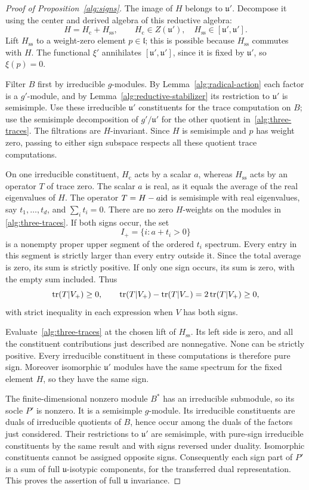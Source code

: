\begin{proof}[Proof of Proposition~\ref{alg:signs}]
The image of $H$ belongs to $\mathfrak u'$. Decompose it using the
center and derived algebra of this reductive algebra:
\[
 H=H_{\mathrm c}+H_{\mathrm{ss}},
 \qquad
 H_{\mathrm c}\in Z(\mathfrak u'),
 \quad H_{\mathrm{ss}}\in[\mathfrak u',\mathfrak u'].
\]
Lift $H_{\mathrm{ss}}$ to a weight-zero element
$p\in\mathfrak l$; this is possible because $H_{\mathrm{ss}}$
commutes with $H$. The functional $\xi'$ annihilates
$[\mathfrak u',\mathfrak u']$, since it is fixed by
$\mathfrak u'$, so $\xi(p)=0$.

Filter $B$ first by irreducible $g$-modules. By
Lemma~\ref{alg:radical-action} each factor is a $g'$-module, and by
Lemma~\ref{alg:reductive-stabilizer} its restriction to
$\mathfrak u'$ is semisimple. Use these irreducible
$\mathfrak u'$ constituents for the trace computation on $B$;
use the semisimple decomposition of $g'/\mathfrak u'$ for the
other quotient in~\eqref{alg:three-traces}. The filtrations are
$H$-invariant. Since $H$ is semisimple and $p$ has weight zero,
passing to either sign subspace respects all these quotient trace
computations.

On one irreducible constituent, $H_{\mathrm c}$ acts by a scalar
$a$, whereas $H_{\mathrm{ss}}$ acts by an operator $T$ of trace
zero. The scalar $a$ is real, as it equals the average of the real
eigenvalues of $H$. The operator $T=H-a\mathrm{id}$ is semisimple with
real eigenvalues, say $t_1,\ldots,t_d$, and
$\sum_i t_i=0$. There are no zero $H$-weights on the modules in
\eqref{alg:three-traces}. If both signs occur, the set
\[
 I_+=\{i:a+t_i>0\}
\]
is a nonempty proper upper segment of the ordered $t_i$ spectrum.
Every entry in this segment is strictly larger than every entry
outside it. Since the total average is zero, its sum is strictly
positive. If only one sign occurs, its sum is zero, with the empty
sum included. Thus
\[
 \operatorname{tr}(T|V_+)\ge0,
 \qquad
 \operatorname{tr}(T|V_+)-\operatorname{tr}(T|V_-)=2\operatorname{tr}(T|V_+)\ge0,
\]
with strict inequality in each expression when $V$ has both signs.

Evaluate~\eqref{alg:three-traces} at the chosen lift of
$H_{\mathrm{ss}}$. Its left side is zero, and all the constituent
contributions just described are nonnegative. None can be strictly
positive. Every irreducible constituent in these computations is
therefore pure sign. Moreover isomorphic $\mathfrak u'$ modules
have the same spectrum for the fixed element $H$, so they have the
same sign.

The finite-dimensional nonzero module $B^*$ has an irreducible
submodule, so its socle $P'$ is nonzero. It is a semisimple
$g$-module. Its irreducible constituents are duals of irreducible
quotients of $B$, hence occur among the duals of the factors just
considered. Their restrictions to $\mathfrak u'$ are semisimple,
with pure-sign irreducible constituents by the same result and with
signs reversed under duality.
Isomorphic constituents cannot be assigned opposite signs.
Consequently each sign part of $P'$ is a sum of full
$\mathfrak u$-isotypic components, for the transferred dual
representation. This proves the assertion of full
$\mathfrak u$ invariance.


\end{proof}
